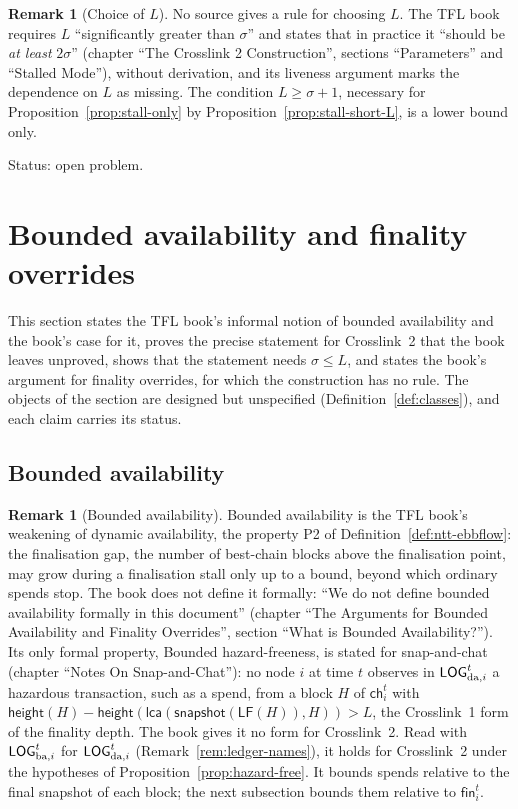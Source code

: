 \documentclass[11pt,a4paper]{article}
\theoremstyle{definition}
\newtheorem{remark}[theorem]{Remark}
\newcommand{\lca}{\mathsf{lca}}
\newcommand{\ch}{\mathsf{ch}}
\newcommand{\snapshot}{\mathsf{snapshot}}
\newcommand{\LF}{\mathsf{LF}}
\newcommand{\fin}{\mathsf{fin}}
\begin{document}
\begin{remark}[Choice of $L$]\label{rem:choose-L}
No source gives a rule for choosing $L$. The TFL book requires $L$
``significantly greater than $\sigma$'' and states that in practice it
``should be \emph{at least} $2\sigma$'' (chapter ``The Crosslink 2
Construction'', sections ``Parameters'' and ``Stalled Mode''), without
derivation, and its liveness argument marks the dependence on $L$ as
missing. The condition $L \ge \sigma + 1$, necessary for
Proposition~\ref{prop:stall-only} by Proposition~\ref{prop:stall-short-L},
is a lower bound only.

Status: open problem.
\end{remark}

\section{Bounded availability and finality overrides}\label{sec:bounded}

This section states the TFL book's informal notion of bounded availability
and the book's case for it, proves the precise statement for Crosslink~2
that the book leaves unproved, shows that the statement needs
$\sigma \le L$, and states the book's argument for finality overrides, for
which the construction has no rule. The objects of the section are designed
but unspecified (Definition~\ref{def:classes}), and each claim carries its
status.

\subsection{Bounded availability}\label{sec:bd-notion}

\begin{remark}[Bounded availability]\label{rem:bounded-avail}
Bounded availability is the TFL book's weakening of dynamic availability,
the property P2 of Definition~\ref{def:ntt-ebbflow}: the finalisation gap,
the number of best-chain blocks above the finalisation point, may grow
during a finalisation stall only up to a bound, beyond which ordinary spends
stop. The book does not define it formally: ``We do not define bounded
availability formally in this document'' (chapter ``The Arguments for
Bounded Availability and Finality Overrides'', section ``What is Bounded
Availability?''). Its only formal property, Bounded hazard-freeness, is
stated for snap-and-chat (chapter ``Notes On Snap-and-Chat''): no node $i$
at time $t$ observes in $\LOGda[i]^t$ a hazardous transaction, such as a
spend, from a block $H$ of $\ch_i^t$ with $\mathsf{height}(H) -
\mathsf{height}(\lca(\snapshot(\LF(H)), H)) > L$, the Crosslink~1 form of the
finality depth. The book gives it no form for Crosslink~2. Read with
$\LOGba[i]^t$ for $\LOGda[i]^t$ (Remark~\ref{rem:ledger-names}), it holds for
Crosslink~2 under the hypotheses of Proposition~\ref{prop:hazard-free}. It
bounds spends relative to the final snapshot of each block; the next
subsection bounds them relative to $\fin_i^t$.
\end{remark}
\end{document}
